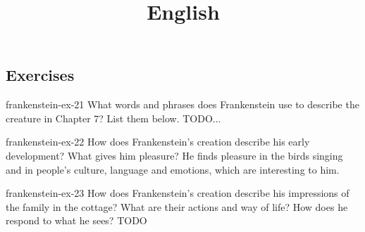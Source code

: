 \documentclass[preview]{standalone}
\begin{document}
\title{English}
\genpage

\subsection{Exercises}

\begin{snippetexercise}{frankenstein-ex-21}
    { What words and phrases does Frankenstein use to describe the creature in Chapter 7? List them
    below.}
    TODO...
\end{snippetexercise}

\begin{snippetexercise}{frankenstein-ex-22}
    {How does Frankenstein's creation describe his early development? What gives him pleasure?}
    He finds pleasure in the birds singing and in people's culture, language
    and emotions, which are interesting to him.
\end{snippetexercise}

\begin{snippetexercise}{frankenstein-ex-23}
    {How does Frankenstein's creation describe his impressions of the family in the cottage? What are
    their actions and way of life? How does he respond to what he sees?}
    TODO 
\end{snippetexercise}
\end{document}

